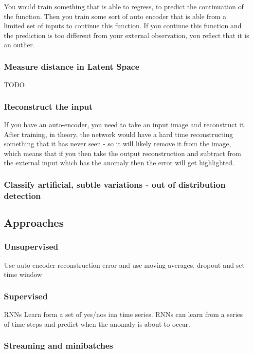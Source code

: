 \documentclass[11pt]{article}
\begin{document}
You would train something that is able to regress, to predict the continuation of the function. Then you train some sort of auto encoder that is able from a limited set of inputs to continue this function. If you continue this function and the prediction is too different from your external observation, you reflect that it is an outlier.

\subsubsection{Measure distance in Latent Space}

TODO

\subsubsection{Reconstruct the input}

If you have an auto-encoder, you need to take an input image and reconstruct it. After training, in theory, the network would have a hard time reconstructing something that it has never seen - so it will likely remove it from the image, which means that if you then take the output reconstruction and subtract from the external input which has the anomaly then the error will get highlighted.

\subsubsection{Classify artificial, subtle variations - out of distribution detection}

\subsection{Approaches}

\subsubsection{Unsupervised}

Use auto-encoder reconstruction error and use moving averages, dropout and set time window

\subsubsection{Supervised}

RNNs Learn form a set of yes/nos ina  time series. RNNs can learn from a series of time steps and predict when the anomaly is about to occur.

\subsubsection{Streaming and minibatches}

\printbibliography
\end{document}
